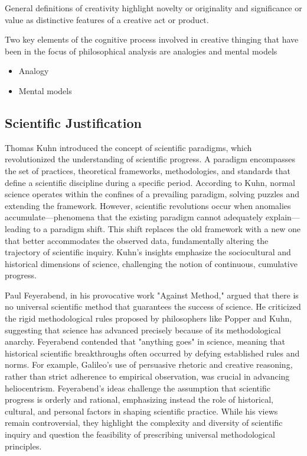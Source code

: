 {\color{red} General definitions of creativity highlight novelty or originality and significance or value as distinctive features of a creative act or product.}

{\color{red} Two key elements of the cognitive process involved in creative thinging that have been in the focus of philosophical analysis are analogies and mental models}

\begin{itemize}

\item Analogy

\item Mental models

\end{itemize}





\subsection{Scientific Justification}

Thomas Kuhn introduced the concept of scientific paradigms, which revolutionized the understanding of scientific progress. A paradigm encompasses the set of practices, theoretical frameworks, methodologies, and standards that define a scientific discipline during a specific period. According to Kuhn, normal science operates within the confines of a prevailing paradigm, solving puzzles and extending the framework. However, scientific revolutions occur when anomalies accumulate—phenomena that the existing paradigm cannot adequately explain—leading to a paradigm shift. This shift replaces the old framework with a new one that better accommodates the observed data, fundamentally altering the trajectory of scientific inquiry. Kuhn's insights emphasize the sociocultural and historical dimensions of science, challenging the notion of continuous, cumulative progress.

Paul Feyerabend, in his provocative work "Against Method," argued that there is no universal scientific method that guarantees the success of science. He criticized the rigid methodological rules proposed by philosophers like Popper and Kuhn, suggesting that science has advanced precisely because of its methodological anarchy. Feyerabend contended that "anything goes" in science, meaning that historical scientific breakthroughs often occurred by defying established rules and norms. For example, Galileo's use of persuasive rhetoric and creative reasoning, rather than strict adherence to empirical observation, was crucial in advancing heliocentrism. Feyerabend's ideas challenge the assumption that scientific progress is orderly and rational, emphasizing instead the role of historical, cultural, and personal factors in shaping scientific practice. While his views remain controversial, they highlight the complexity and diversity of scientific inquiry and question the feasibility of prescribing universal methodological principles.

